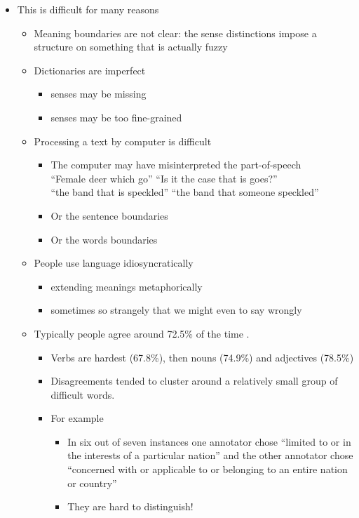 \documentclass[a4paper,landscape,headrule,footrule,xetex]{foils}
\begin{document}
\begin{itemize}
\newpage 
\item This is difficult for many reasons
  \begin{itemize}
  \item Meaning boundaries are not clear: the sense distinctions
    impose a structure on something that is actually fuzzy
  \item Dictionaries are imperfect
    \begin{itemize}
    \item senses may be missing
    \item senses may be too fine-grained
    \end{itemize}
  \item Processing a text by computer is difficult
    \begin{itemize}
    \item The computer may have misinterpreted the part-of-speech
      \\   ``Female deer which go'' ``Is it the case that is goes?''
      \\  ``the band that is speckled'' ``the band that someone speckled''
    \item Or the sentence boundaries
    \item Or the words boundaries
    \end{itemize}
  \item People use language idiosyncratically 
    \begin{itemize}
    \item extending meanings metaphorically
    \item sometimes so strangely that we might even to say wrongly
    \end{itemize}
\newpage
  \item Typically people agree around 72.5\% of the time \citep{Snyder:Palmer:2004}.
    \begin{itemize}
    \item  Verbs are hardest (67.8\%), then nouns (74.9\%) and adjectives (78.5\%)
    \item Disagreements tended to cluster around a relatively small group of difficult words.
    \item For example 
      \begin{itemize}
      \item In six out of seven instances one annotator chose
        ``limited to or in the interests of a particular nation'' and
        the other annotator chose ``concerned with or applicable to or
        belonging to an entire nation or country''
      \item They are hard to distinguish!
      \end{itemize}
    \end{itemize}
  \end{itemize}
\end{itemize}
\end{document}
